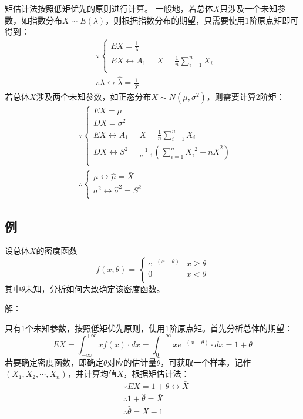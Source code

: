 矩估计法按照低矩优先的原则进行计算。
一般地，若总体$X$只涉及一个未知参数，如指数分布$X\sim E\left( \lambda \right) $，则根据指数分布的期望，只需要使用1阶原点矩即可得到：
\begin{align*}
&\because \begin{cases}
	EX=\frac{1}{\lambda}\\
	EX\leftrightarrow A_1=\bar{X}=\frac{1}{n}\sum_{i=1}^n{X_i}\\
\end{cases} \\
&\therefore \lambda \leftrightarrow \hat{\lambda}=\frac{1}{\bar{X}}
\end{align*}
若总体$X$涉及两个未知参数，如正态分布$X\sim N\left( \mu ,\sigma ^2 \right) $，则需要计算2阶矩：
\begin{align*}
&\because \begin{cases}
	EX=\mu\\
	DX=\sigma ^2\\
	EX\leftrightarrow A_1=\bar{X}=\frac{1}{n}\sum_{i=1}^n{X_i}\\
	DX\leftrightarrow S^2=\frac{1}{n-1}\left( \sum_{i=1}^n{{X_i}^2}-n\bar{X}^2 \right)\\
\end{cases} \\
&\therefore \begin{cases}
	\mu \leftrightarrow \hat{\mu}=\bar{X}\\
	\sigma ^2\leftrightarrow \hat{\sigma}^2=S^2\\
\end{cases}
\end{align*}

\subsection{例}

\begin{example}
设总体$X$的密度函数
\[
f\left( x;\theta \right) =\begin{cases}
	e^{-\left( x-\theta \right)}&		x\geqslant \theta\\
	0&		x<\theta\\
\end{cases}
\]
其中$\theta $未知，分析如何大致确定该密度函数。
\end{example}

解：

只有1个未知参数，按照低矩优先原则，使用1阶原点矩。首先分析总体的期望：
\[
EX=\int_{-\infty}^{+\infty}{xf\left( x \right) \cdot dx}=\int_0^{+\infty}{xe^{-\left( x-\theta \right)}\cdot dx}=1+\theta
\]
若要确定密度函数，即确定$\theta $对应的估计量$\hat{\theta}$，可获取一个样本，记作$\left( X_1,X_2,\cdots ,X_n \right) $，并计算均值$\bar{X}$，根据矩估计法：
\begin{align*}
&\because EX=1+\theta \leftrightarrow \bar{X} \\
&\therefore 1+\hat{\theta}=\bar{X} \\
&\therefore \hat{\theta}=\bar{X}-1
\end{align*}

